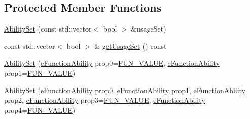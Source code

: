 \subsection*{Protected Member Functions}
\begin{DoxyCompactItemize}
\item 
\hyperlink{classocra_1_1AbilitySet_a0438cd73b840913711d2e7a768ff343a}{Ability\+Set} (const std\+::vector$<$ bool $>$ \&usage\+Set)
\item 
const std\+::vector$<$ bool $>$ \& \hyperlink{classocra_1_1AbilitySet_ad41c3c99bdf8d5d77de62b77424557ff}{get\+Usage\+Set} () const 
\end{DoxyCompactItemize}
{\bf }\par
\begin{DoxyCompactItemize}
\item 
\hyperlink{classocra_1_1AbilitySet_aec4a09919c73fc5e27aef8af05e7ebcf}{Ability\+Set} (\hyperlink{namespaceocra_a40ddbec106a6034cd2047bba9945b568}{e\+Function\+Ability} prop0=\hyperlink{namespaceocra_a40ddbec106a6034cd2047bba9945b568acfb47b20329993093d2022b017239bd8}{F\+U\+N\+\_\+\+V\+A\+L\+UE}, \hyperlink{namespaceocra_a40ddbec106a6034cd2047bba9945b568}{e\+Function\+Ability} prop1=\hyperlink{namespaceocra_a40ddbec106a6034cd2047bba9945b568acfb47b20329993093d2022b017239bd8}{F\+U\+N\+\_\+\+V\+A\+L\+UE})
\item 
\hyperlink{classocra_1_1AbilitySet_a7ac0f7bd650b04cef83728ea1d121015}{Ability\+Set} (\hyperlink{namespaceocra_a40ddbec106a6034cd2047bba9945b568}{e\+Function\+Ability} prop0, \hyperlink{namespaceocra_a40ddbec106a6034cd2047bba9945b568}{e\+Function\+Ability} prop1, \hyperlink{namespaceocra_a40ddbec106a6034cd2047bba9945b568}{e\+Function\+Ability} prop2, \hyperlink{namespaceocra_a40ddbec106a6034cd2047bba9945b568}{e\+Function\+Ability} prop3=\hyperlink{namespaceocra_a40ddbec106a6034cd2047bba9945b568acfb47b20329993093d2022b017239bd8}{F\+U\+N\+\_\+\+V\+A\+L\+UE}, \hyperlink{namespaceocra_a40ddbec106a6034cd2047bba9945b568}{e\+Function\+Ability} prop4=\hyperlink{namespaceocra_a40ddbec106a6034cd2047bba9945b568acfb47b20329993093d2022b017239bd8}{F\+U\+N\+\_\+\+V\+A\+L\+UE})
\item 

\end{DoxyCompactItemize}
